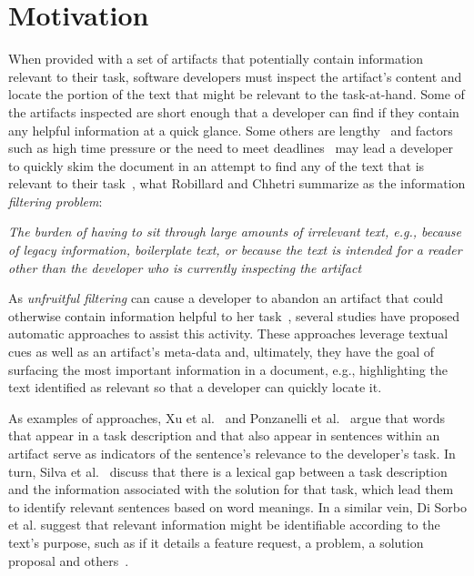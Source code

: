 \section{Motivation}
\label{cp5:motivation}


When provided with a set of artifacts that potentially contain information relevant to their task,
software developers must inspect the artifact's content and locate the portion of the text that might be relevant to the task-at-hand. 
Some of the artifacts inspected are short enough that a developer can find if they contain any helpful information at a quick glance.
Some others are lengthy~\cite{Rastkar2013t} and factors such
as high time pressure or
the need to meet deadlines~\cite{meyer2019}
may lead a developer to quickly skim the document
in an attempt to find any of the text that is relevant to their task~\cite{Starke2009},
what Robillard and Chhetri summarize as the information \textit{filtering problem}:

\smallskip
\begin{bluequote}
    \textit{The burden  of having to sit through large amounts of irrelevant text, e.g., because of legacy information, boilerplate text, or because the text is intended for a reader other than the developer who is currently inspecting the artifact}~\cite{Robillard2015}
\end{bluequote}



As \textit{unfruitful filtering} can 
cause a developer to abandon an artifact that could otherwise contain information  helpful to her task~\cite{Brandt2009a, Starke2009},
several studies have proposed automatic approaches to assist this activity. 
These approaches leverage textual cues as well as an artifact's meta-data and, ultimately, they have the goal of surfacing 
the most important information in a document, e.g., highlighting the text identified as relevant so that a developer can quickly 
locate it.


As examples of approaches, Xu et al.~\cite{Xu2017} and Ponzanelli et al.~\cite{Ponzanelli2015}
argue that words that appear in a task description and that also appear in sentences within an artifact serve as indicators of the sentence's relevance to the developer's task.
In turn, Silva et al.~\cite{silva2019} discuss that 
there is a lexical gap between a task description and the information associated 
with the solution for that task, which lead them to identify
relevant sentences based on word meanings.
In a similar vein, Di Sorbo et al. suggest that relevant information might be identifiable 
according to the text's purpose, such as if it details a feature request, a problem, a solution proposal and others~\cite{Sorbo2015}.


